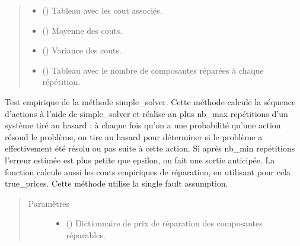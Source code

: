 \documentclass[letterpaper,10pt,french]{sphinxmanual}
\begin{document}
\begin{fulllineitems}
\begin{fulllineitems}
\begin{quote}
\begin{description}
\begin{itemize}
\item {} 
 () \textendash{} Tableau avec les cout associés.

\item {} 
 () \textendash{} Moyenne des couts.

\item {} 
 () \textendash{} Variance des couts.

\item {} 
 () \textendash{} Tableau avec le nombre de composantes réparées à chaque répétition.

\end{itemize}


\end{description}\end{quote}

\end{fulllineitems}


\begin{fulllineitems}
\label{\detokenize{index:DecisionTheoreticTroubleshooting.TroubleShootingProblem.simple_solver_tester}}
Test empirique de la méthode simple\_solver. Cette méthode calcule la
séquence d’actions à l’aide de simple\_solver et réalise au plus nb\_max
repétitions d’un système tiré au hasard : à chaque fois qu’on a une
probabilité qu’une action résoud le problème, on tire au hasard pour
déterminer si le problème a effectivement été résolu ou pas suite à
cette action. Si après nb\_min repétitions l’erreur estimée est plus
petite que epsilon, on fait une sortie anticipée. La fonction calcule
aussi les couts empiriques de réparation, en utilisant pour cela
true\_prices. Cette méthode utilise la single fault assumption.
\begin{quote}\begin{description}
\item[{Paramètres}] \leavevmode\begin{itemize}
\item {} 
 () \textendash{} Dictionnaire de prix de réparation des composantes réparables.


\end{itemize}
\end{description}
\end{quote}
\end{fulllineitems}
\end{fulllineitems}
\end{document}
